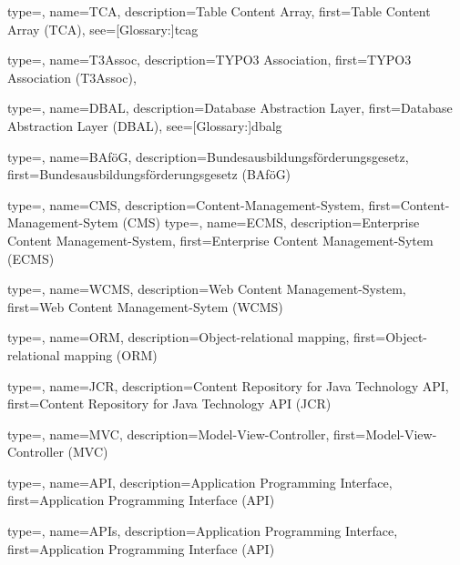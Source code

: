 

{
	type=\acronymtype,
	name={TCA},
	description={Table Content Array},
	first={Table Content Array (TCA)},
	see=[Glossary:]{tcag}
}

{
	type=\acronymtype,
	name={T3Assoc},
	description={TYPO3 Association},
	first={TYPO3 Association (T3Assoc)},
}

{
	type=\acronymtype,
	name={DBAL},
	description={Database Abstraction Layer},
	first={Database Abstraction Layer (DBAL)},
	see=[Glossary:]{dbalg}
}

{
	type=\acronymtype,
	name={BAföG},
	description={Bundesausbildungsförderungsgesetz},
	first={Bundesausbildungsförderungsgesetz (BAföG)}
}

{
	type=\acronymtype,
	name={CMS},
	description={Content-Management-System},
	first={Content-Management-Sytem (CMS)}
}
{
	type=\acronymtype,
	name={ECMS},
	description={Enterprise Content Management-System},
	first={Enterprise Content Management-Sytem (ECMS)}
}

{
	type=\acronymtype,
	name={WCMS},
	description={Web Content Management-System},
	first={Web Content Management-Sytem (WCMS)}
}

{
	type=\acronymtype,
	name={ORM},
	description={Object-relational mapping},
	first={Object-relational mapping (ORM)}
}

{
	type=\acronymtype,
	name={JCR},
	description={Content Repository for Java Technology API},
	first={Content Repository for Java Technology API (JCR)}
}

{
	type=\acronymtype,
	name={MVC},
	description={Model-View-Controller},
	first={Model-View-Controller (MVC)}
}

{
	type=\acronymtype,
	name={API},
	description={Application Programming Interface},
	first={Application Programming Interface (API)}
}

{
	type=\acronymtype,
	name={APIs},
	description={Application Programming Interface},
	first={Application Programming Interface (API)}
}

